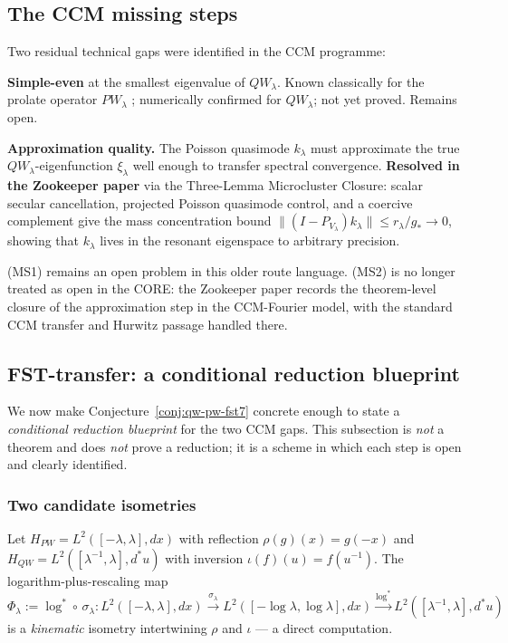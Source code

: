 \documentclass[11pt,a4paper]{article}
\theoremstyle{plain}
\theoremstyle{definition}
\begin{document}
\subsection{The CCM missing steps}
\label{sec:ccm-missing-steps}

Two residual technical gaps were identified in the CCM programme:
\begin{description}[leftmargin=*,style=nextline]
\item[(MS1)] \textbf{Simple-even} at the smallest eigenvalue of
  $QW_\lambda$.  Known classically for the prolate operator
  $PW_\lambda$ \cite{SlepianPollack1961}; numerically confirmed for
  $QW_\lambda$; not yet proved.  Remains open.
\item[(MS2)] \textbf{Approximation quality.} The Poisson quasimode
  $k_\lambda$ must approximate the true $QW_\lambda$-eigenfunction
  $\xi_\lambda$ well enough to transfer spectral convergence.
  \textbf{Resolved in the Zookeeper paper} via the Three-Lemma
  Microcluster Closure: scalar secular cancellation, projected
  Poisson quasimode control, and a coercive complement give the mass
  concentration bound
  $\|(I-P_{V_\lambda})k_\lambda\| \leq r_\lambda/g_* \to 0$,
  showing that $k_\lambda$ lives in the resonant eigenspace to
  arbitrary precision.
\end{description}

(MS1) remains an open problem in this older route language.  (MS2)
is no longer treated as open in the CORE: the Zookeeper paper records
the theorem-level closure of the approximation step in the
CCM-Fourier model, with the standard CCM transfer and Hurwitz passage
handled there.

\subsection{FST-transfer: a conditional reduction blueprint}
\label{sec:fst-transfer}

We now make Conjecture~\ref{conj:qw-pw-fst7} concrete enough to
state a \emph{conditional reduction blueprint} for the two CCM gaps.
This subsection is \emph{not} a theorem and does \emph{not} prove a
reduction; it is a scheme in which each step is open and clearly
identified.

\subsubsection{Two candidate isometries}

Let $H_{PW} = L^2([-\lambda, \lambda], dx)$ with reflection
$\rho(g)(x) = g(-x)$ and $H_{QW} = L^2([\lambda^{-1}, \lambda],
d^\ast u)$ with inversion $\iota(f)(u) = f(u^{-1})$.  The
logarithm-plus-rescaling map
\[
  \Phi_\lambda := \log^\ast \circ \, \sigma_\lambda :
    L^2([-\lambda, \lambda], dx) \xrightarrow{\sigma_\lambda}
    L^2([-\log\lambda, \log\lambda], dx)
    \xrightarrow{\log^\ast}
    L^2([\lambda^{-1}, \lambda], d^\ast u)
\]
is a \emph{kinematic} isometry intertwining $\rho$ and $\iota$ --- a
direct computation.
\end{document}
